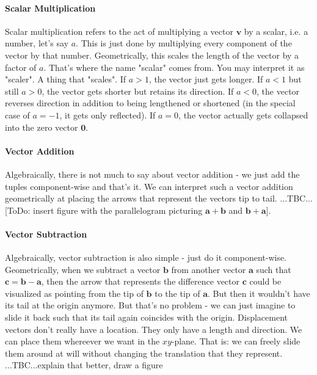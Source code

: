 \paragraph{Scalar Multiplication}
Scalar multiplication refers to the act of multiplying a vector $\mathbf{v}$ by a scalar, i.e. a number, let's say $a$. This is just done by multiplying every component of the vector by that number. Geometrically, this scales the length of the vector by a factor of $a$. That's where the name "scalar" comes from. You may interpret it as "scaler". A thing that "scales". If $a > 1$, the vector just gets longer. If $a < 1$ but still $a > 0$, the vector gets shorter but retains its direction. If $a < 0$, the vector reverses direction in addition to being lengthened or shortened (in the special case of $a=-1$, it gets only reflected). If $a = 0$, the vector actually gets collapsed into the zero vector $\mathbf{0}$.

\paragraph{Vector Addition}
Algebraically, there is not much to say about vector addition - we just add the tuples component-wise and that's it. We can interpret such a vector addition geometrically at placing the arrows that represent the vectors tip to tail. ...TBC... [ToDo: insert figure with the parallelogram picturing $\mathbf{a + b}$ and $\mathbf{b + a}$].

% 

\paragraph{Vector Subtraction}
Algebraically, vector subtraction is also simple - just do it component-wise. Geometrically, when we subtract a vector $\mathbf{b}$ from another vector $\mathbf{a}$ such that $\mathbf{c = b-a}$, then the arrow that represents the difference vector $\mathbf{c}$ could be visualized as pointing from the tip of $\mathbf{b}$ to the tip of $\mathbf{a}$. But then it wouldn't have its tail at the origin anymore. But that's no problem - we can just imagine to slide it back such that its tail again coincides with the origin. Displacement vectors don't really have a location. They only have a length and direction. We can place them whereever we want in the $xy$-plane. That is: we can freely slide them around at will without changing the translation that they represent. ...TBC...explain that better, draw a figure

